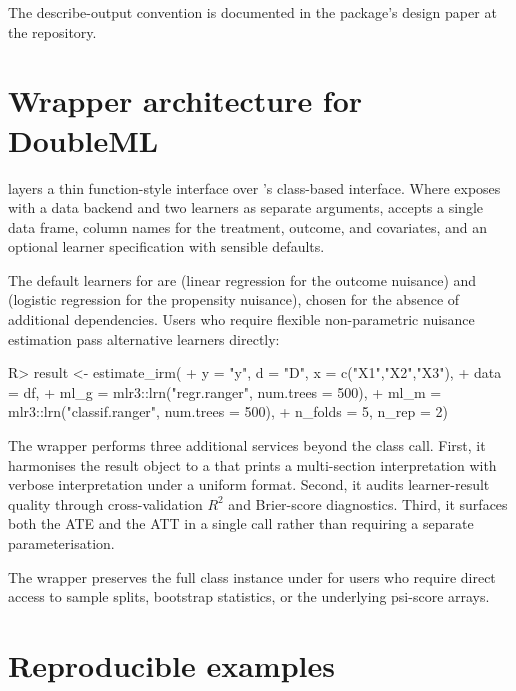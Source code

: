 \documentclass[article,shortnames,nojss]{jss}
\begin{document}
\noindent The describe-output convention is documented in the
package's design paper at the repository.

\section{Wrapper architecture for DoubleML}
\label{sec:wrapper}

 layers a thin function-style interface over
's class-based interface. Where 
exposes  with a
data backend and two  learners as separate arguments,
 accepts a single data frame, column
names for the treatment, outcome, and covariates, and an optional
learner specification with sensible defaults.

The default learners for  are
 (linear regression for the outcome nuisance)
and  (logistic regression for the
propensity nuisance), chosen for the absence of additional
dependencies. Users who require flexible non-parametric nuisance
estimation pass alternative  learners directly:

\begin{Code}
R> result <- estimate_irm(
+   y       = "y", d = "D", x = c("X1","X2","X3"),
+   data    = df,
+   ml_g    = mlr3::lrn("regr.ranger", num.trees = 500),
+   ml_m    = mlr3::lrn("classif.ranger", num.trees = 500),
+   n_folds = 5, n_rep = 2)
\end{Code}

\noindent The wrapper performs three additional services beyond
the  class call. First, it harmonises the result
object to a  that prints a multi-section
interpretation with verbose interpretation under a uniform format.
Second, it audits learner-result quality through cross-validation
$R^{2}$ and Brier-score diagnostics. Third, it surfaces both the
ATE and the ATT in a single call rather than requiring a separate
 parameterisation.

The wrapper preserves the full  class instance under
 for users who require direct access to
sample splits, bootstrap statistics, or the underlying psi-score
arrays.

\section{Reproducible examples}
\label{sec:examples}
\end{document}
